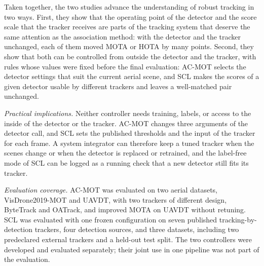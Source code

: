 Taken together, the two studies advance the understanding of robust tracking in two ways. First, they show that the operating point of the detector and the score scale that the tracker receives are parts of the tracking system that deserve the same attention as the association method: with the detector and the tracker unchanged, each of them moved MOTA or HOTA by many points. Second, they show that both can be controlled from outside the detector and the tracker, with rules whose values were fixed before the final evaluation: AC-MOT selects the detector settings that suit the current aerial scene, and SCL makes the scores of a given detector usable by different trackers and leaves a well-matched pair unchanged.

\emph{Practical implications.} Neither controller needs training, labels, or access to the inside of the detector or the tracker. AC-MOT changes three arguments of the detector call, and SCL sets the published thresholds and the input of the tracker for each frame. A system integrator can therefore keep a tuned tracker when the scenes change or when the detector is replaced or retrained, and the label-free mode of SCL can be logged as a running check that a new detector still fits its tracker.

\emph{Evaluation coverage.} AC-MOT was evaluated on two aerial datasets, VisDrone2019-MOT and UAVDT, with two trackers of different design, ByteTrack and OATrack, and improved MOTA on UAVDT without retuning. SCL was evaluated with one frozen configuration on seven published tracking-by-detection trackers, four detection sources, and three datasets, including two predeclared external trackers and a held-out test split. The two controllers were developed and evaluated separately; their joint use in one pipeline was not part of the evaluation.


